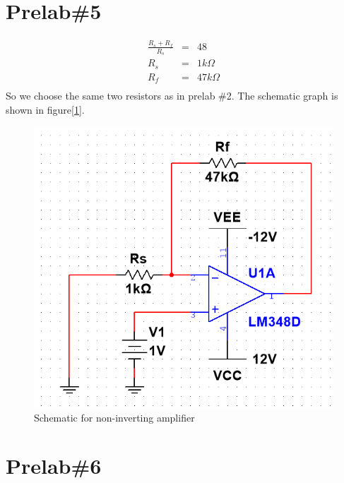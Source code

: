 \documentclass{IEEEtran}
\begin{document}
	\section{\textbf{Prelab\#5}}
	\begin{eqnarray*}
		\frac{R_s+R_f}{R_s} & = & 48\\
		R_s & = & 1\si{k\Omega}\\
		R_f & = & 47\si{k\Omega}\\
	\end{eqnarray*}
	So we choose the same two resistors as in prelab \#2. The schematic graph is shown in figure[\ref{fig:501}].
	\begin{figure}[!htbp]
		\centering
		\begin{framed}
			\includegraphics[width=\linewidth]{images/5_1.PNG}
			\caption{Schematic for non-inverting amplifier}
			\label{fig:501}
		\end{framed}
	\end{figure}

	\section{\textbf{Prelab\#6}}
\end{document}
